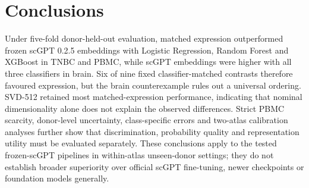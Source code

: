 \section{Conclusions}

Under five-fold donor-held-out evaluation, matched expression outperformed frozen scGPT 0.2.5 embeddings with Logistic Regression, Random Forest and XGBoost in TNBC and PBMC, while scGPT embeddings were higher with all three classifiers in brain. Six of nine fixed classifier-matched contrasts therefore favoured expression, but the brain counterexample rules out a universal ordering. SVD-512 retained most matched-expression performance, indicating that nominal dimensionality alone does not explain the observed differences. Strict PBMC scarcity, donor-level uncertainty, class-specific errors and two-atlas calibration analyses further show that discrimination, probability quality and representation utility must be evaluated separately. These conclusions apply to the tested frozen-scGPT pipelines in within-atlas unseen-donor settings; they do not establish broader superiority over official scGPT fine-tuning, newer checkpoints or foundation models generally.
